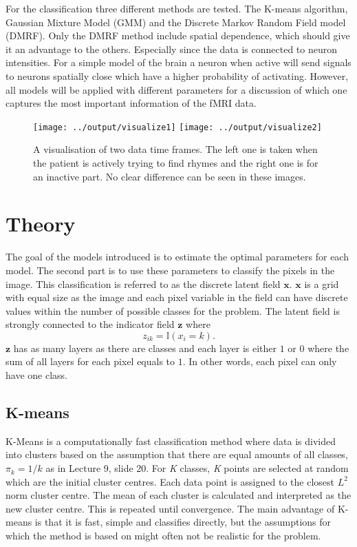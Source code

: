 \documentclass[a4paper,english]{article}
\begin{document}
For the classification three different methods are tested.
The K-means algorithm, Gaussian Mixture Model (GMM) and the Discrete Markov Random Field model (DMRF).
Only the DMRF method include spatial dependence, which should give it an advantage to the others.
Especially since the data is connected to neuron intensities.
For a simple model of the brain a neuron when active will send signals to neurons spatially close which have a higher probability of activating.
However, all models will be applied with different parameters for a discussion of which one captures the most important information of the fMRI data.

\begin{figure}[H]
  \centering
  \texttt{[image: ../output/visualize1]}
  \texttt{[image: ../output/visualize2]}
  \caption{A visualisation of two data time frames. The left one is taken when the patient is actively trying to find rhymes and the right one is for an inactive part. No clear difference can be seen in these images.}
  \label{fig:intro:vis}
\end{figure}

\section{Theory}
The goal of the models introduced is to estimate the optimal parameters for each model.
The second part is to use these parameters to classify the pixels in the image.
This classification is referred to as the discrete latent field $\boldsymbol{x}$.
$\boldsymbol{x}$ is a grid with equal size as the image and each pixel variable in the field can have discrete values within the number of possible classes for the problem.
The latent field is strongly connected to the indicator field $\boldsymbol{z}$ where
\begin{equation}
  z_{ik} = \mathds{I}(x_i = k).
\end{equation}
$\boldsymbol{z}$ has as many layers as there are classes and each layer is either $1$ or $0$ where the sum of all layers for each pixel equals to $1$.
In other words, each pixel can only have one class.

\subsection{K-means}

K-Means is a computationally fast classification method where data is divided into clusters based on the assumption that there are equal amounts of all classes, $\pi_k = 1 / k$ as in Lecture 9, slide 20\cite{L09}. For \textit{K} classes, \textit{K} points are selected at random which are the initial cluster centres. Each data point is assigned to the closest $L^2$ norm cluster centre. The mean of each cluster is calculated and interpreted as the new cluster centre. This is repeated until convergence. The main advantage of K-means is that it is fast, simple and classifies directly, but the assumptions for which the method is based on might often not be realistic for the problem.
\end{document}
